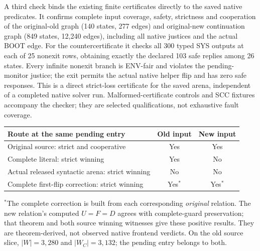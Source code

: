 A third check binds the existing finite certificates directly to the
saved native predicates. It confirms complete input coverage, safety,
strictness and cooperation of the original-old graph (140 states,
277 edges) and original-new continuation graph (849 states,
12,240 edges), including all native justices and the actual BOOT edge.
For the countercertificate it checks all 300 typed SYS outputs at each
of 25 nonexit rows, obtaining exactly the declared 103 safe replies
among 26 states. Every infinite nonexit branch is ENV-fair and violates
the pending-monitor justice; the exit permits the actual native helper
flip and has zero safe responses. This is a direct strict-loss
certificate for the saved arena, independent of a completed native
solver run. Malformed-certificate controls and SCC fixtures accompany the
checker; they are selected qualifications, not exhaustive fault coverage.

\begin{center}
\begin{tabular}{lcc}\toprule
Route at the same pending entry & Old input & New input\\\midrule
Original source: strict and cooperative & Yes & Yes\\
Complete literal: strict winning & Yes & No\\
Actual released syntactic arena: strict winning & No & No\\
Complete first-flip correction: strict winning & Yes$^{*}$ & Yes$^{*}$\\\bottomrule
\end{tabular}
\end{center}
\noindent $^{*}$The complete correction is built from each corresponding
\emph{original} relation. The new relation's computed $U=F=D$ agrees with
complete-guard preservation; that theorem and both source winning
witnesses give these positive results. They are theorem-derived, not
observed native frontend verdicts.
On the old source slice, $|W|=3{,}280$ and $|W_C|=3{,}132$;
the pending entry belongs to both.

